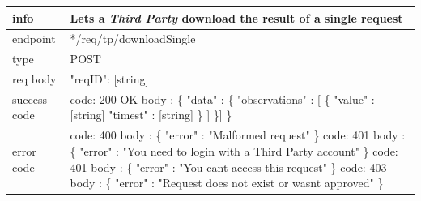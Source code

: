 \documentclass[titlepage]{article}
\begin{document}
	\begin{tabularx}{\textwidth}{lX} \hline
		info & Lets a {\it Third Party} download the result of a single request \\ \hline
		endpoint & */req/tp/downloadSingle \\ \hline
		type & POST \\ \hline
		req body &
		"reqID": [string] \\ \hline
		success code &
		code: 200 OK \newline  
		body : \{ \newline
		"data" : \{ \newline
		[\{\newline
		"type" : [string]\newline
		"observations" : [\newline
		\{ \newline
		"value" : [string] \newline
		"timest" : [string] \newline
		\} \newline
		]\newline
		\}] \newline
		\} \\ \hline
		error code &
		code: 400 \newline
		body : \{ "error" : "Malformed request" \} \newline \newline
		code: 401 \newline
		body : \{ "error" : "You need to login with a Third Party account" \} \newline \newline 
		code: 401 \newline
		body : \{ "error" : "You can\textsc{\char13}t access this request" \} \newline \newline 
		code: 403 \newline
		body : \{ "error" : "Request does not exist or wasn\textsc{\char13}t approved" \} \\ \hline
	\end{tabularx}
	
	\vspace{\baselineskip}
	
\end{document}
